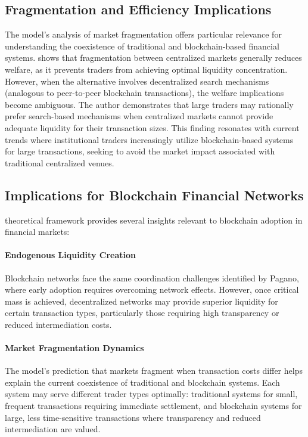 \subsection{Fragmentation and Efficiency Implications}
The model's analysis of market fragmentation offers particular relevance for understanding the coexistence of traditional and blockchain-based financial systems.  shows that fragmentation between centralized markets generally reduces welfare, as it prevents traders from achieving optimal liquidity concentration. However, when the alternative involves decentralized search mechanisms (analogous to peer-to-peer blockchain transactions), the welfare implications become ambiguous.
The author demonstrates that large traders may rationally prefer search-based mechanisms when centralized markets cannot provide adequate liquidity for their transaction sizes. This finding resonates with current trends where institutional traders increasingly utilize blockchain-based systems for large transactions, seeking to avoid the market impact associated with traditional centralized venues.
\subsection{Implications for Blockchain Financial Networks}
 theoretical framework provides several insights relevant to blockchain adoption in financial markets:
\paragraph{Endogenous Liquidity Creation} Blockchain networks face the same coordination challenges identified by Pagano, where early adoption requires overcoming network effects. However, once critical mass is achieved, decentralized networks may provide superior liquidity for certain transaction types, particularly those requiring high transparency or reduced intermediation costs.
\paragraph{Market Fragmentation Dynamics} The model's prediction that markets fragment when transaction costs differ helps explain the current coexistence of traditional and blockchain systems. Each system may serve different trader types optimally: traditional systems for small, frequent transactions requiring immediate settlement, and blockchain systems for large, less time-sensitive transactions where transparency and reduced intermediation are valued.
